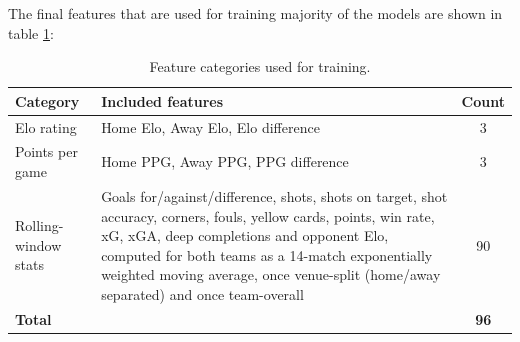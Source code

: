 \documentclass{article}
\begin{document}
The final features that are used for training majority of the models are shown in table \ref{tab:feature_categories}:

\begin{table}[H]
\centering
\begin{tabular}{lp{8.5cm}c}
\toprule
\textbf{Category} & \textbf{Included features} & \textbf{Count} \\
\midrule
Elo rating & Home Elo, Away Elo, Elo difference & 3 \\
Points per game & Home PPG, Away PPG, PPG difference & 3 \\
Rolling-window stats & Goals for/against/difference, shots, shots on target, shot accuracy, corners, fouls, yellow cards, points, win rate, xG, xGA, deep completions and opponent Elo, computed for both teams as a 14-match exponentially weighted moving average, once venue-split (home/away separated) and once team-overall & 90 \\
\midrule
\textbf{Total} & & \textbf{96} \\
\bottomrule
\end{tabular}
\caption{Feature categories used for training.}
\label{tab:feature_categories}
\end{table}
\end{document}
